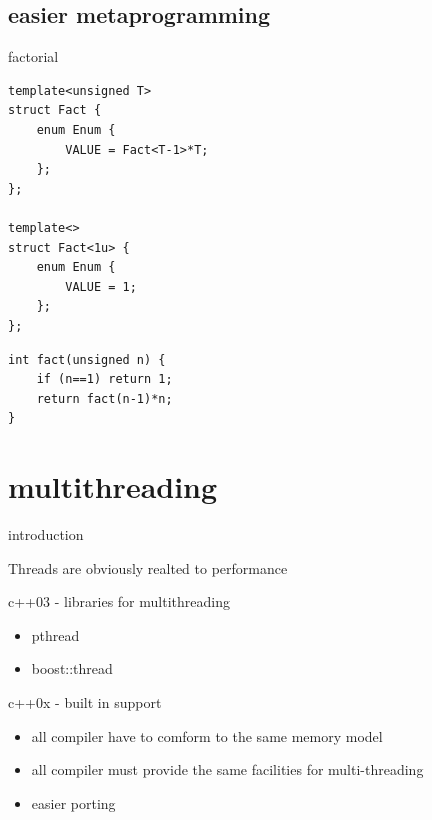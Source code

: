 \documentclass{beamer}
\begin{document}
\subsection{easier metaprogramming}
\begin{frame}[fragile]{factorial}
  \begin{block}{}
\begin{verbatim}
template<unsigned T>
struct Fact {
    enum Enum {
        VALUE = Fact<T-1>*T;
    };
};

template<>
struct Fact<1u> {
    enum Enum {
        VALUE = 1;
    };
};

\end{verbatim}
  \end{block}

  \begin{block}{}
\begin{verbatim}
int fact(unsigned n) {
    if (n==1) return 1;
    return fact(n-1)*n;
}

\end{verbatim}
  \end{block}
\end{frame}

\section{multithreading}
\begin{frame}{introduction}
  \begin{block}{}
    Threads are obviously realted to performance
  \end{block}

  \begin{block}{c++03 - libraries for multithreading}
    \begin{itemize}
    \item pthread
    \item boost::thread
    \end{itemize}
  \end{block}

  \begin{block}{c++0x - built in support}
    \begin{itemize}
    \item all compiler have to comform to the same memory model
    \item all compiler must provide the same facilities for multi-threading
    \item easier porting
    \end{itemize}
  \end{block}
\end{frame}
\end{document}
